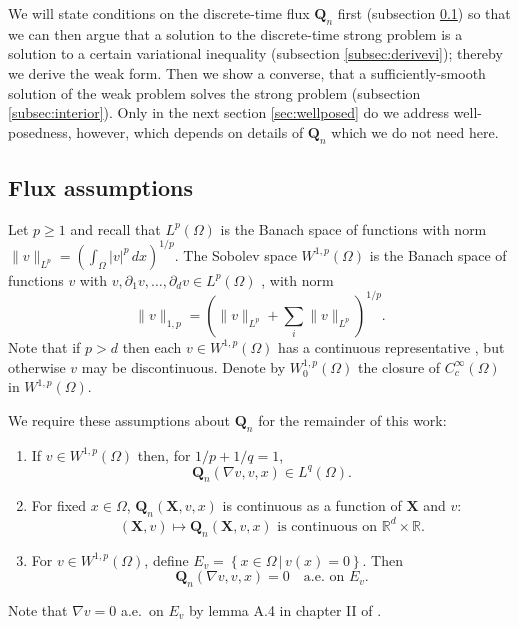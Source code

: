 \documentclass[final,leqno,onefignum,onetabnum]{siamltex1213bueler}
\newcommand\bQ{\mathbf{Q}}
\newcommand\bX{\mathbf{X}}
\renewcommand{\grad}{\nabla}
\newcommand\RR{\mathbb{R}}
\begin{document}
We will state conditions on the discrete-time flux $\bQ_n$ first (subsection \ref{subsec:fluxassumptions}) so that we can then argue that a solution to the discrete-time strong problem is a solution to a certain variational inequality (subsection \ref{subsec:derivevi}); thereby we derive the weak form.  Then we show a converse, that a sufficiently-smooth solution of the weak problem solves the strong problem (subsection \ref{subsec:interior}).  Only in the next section \ref{sec:wellposed} do we address well-posedness, however, which depends on details of $\bQ_n$ which we do not need here.

\subsection{Flux assumptions} \label{subsec:fluxassumptions}  Let $p\ge 1$ and recall that $L^p (\Omega)$ is the Banach space of functions with norm $\|v\|_{L^p} = \left(\int_\Omega |v|^p\,dx\right)^{1/p}$.  The Sobolev space $W^{1,p}(\Omega)$ is the Banach space of functions $v$ with $v,\partial_1 v,\dots,\partial_d v \in L^p(\Omega)$ \cite{Evans}, with norm
\begin{equation}
  \|v\|_{1,p} = \left(\|v\|_{L^p} + \sum_i \|v\|_{L^p}\right)^{1/p}.  \label{eq:norm}
\end{equation}
Note that if $p>d$ then each $v\in W^{1,p}(\Omega)$ has a continuous representative \cite[``Morrey's inequality'']{Evans}, but otherwise $v$ may be discontinuous.  Denote by $W_0^{1,p}(\Omega)$ the closure of $C_c^\infty(\Omega)$ in $W^{1,p}(\Omega)$.

We require these assumptions about $\bQ_n$ for the remainder of this work:

\medskip
\renewcommand{\labelenumi}{(\roman{enumi})}
\begin{enumerate}
\item If $v \in W^{1,p}(\Omega)$ then, for $1/p + 1/q = 1$,
\begin{equation}
\bQ_n(\grad v,v,x) \in L^q(\Omega). \label{eq:QisLq}
\end{equation}
\item For fixed $x\in \Omega$, $\bQ_n(\bX,v,x)$ is continuous as a function of $\bX$ and $v$:
\begin{equation}
(\bX,v) \mapsto \bQ_n(\bX,v,x) \text{ is continuous on } \RR^d \times \RR.  \label{eq:Qiscontinuous}
\end{equation}
\item For $v \in W^{1,p}(\Omega)$, define $E_v = \left\{x\in\Omega \,\big|\, v(x) = 0\right\}$.  Then
\begin{equation}
\bQ_n(\grad v,v,x)=0 \quad \text{a.e.~on } E_v. \label{eq:Qiszero}
\end{equation}
\end{enumerate}
Note that $\grad v = 0$ a.e.~on $E_v$ by lemma A.4 in chapter II of \cite{KinderlehrerStampacchia}.
\end{document}
